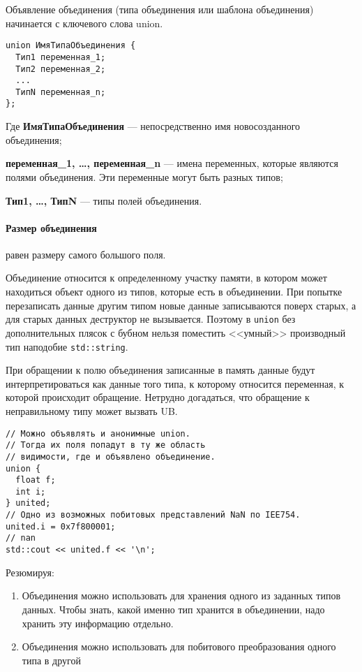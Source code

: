 Объявление объединения (типа объединения или шаблона объединения) начинается с ключевого слова union.

\begin{verbatim}
union ИмяТипаОбъединения {
  Тип1 переменная_1;
  Тип2 переменная_2;
  ...
  ТипN переменная_n;
};
\end{verbatim}

Где
\textbf{ИмяТипаОбъединения} --- непосредственно имя новосозданного объединения;

\textbf{переменная\_1, \dots, переменная\_n} --- имена переменных, которые являются полями объединения.
Эти переменные могут быть разных типов;

\textbf{Тип1, \dots, ТипN} --- типы полей объединения.

\paragraph{Размер объединения} равен размеру самого большого поля.

Объединение относится к определенному участку памяти, в котором может находиться объект одного из типов,
которые есть в объединении. При попытке перезаписать данные другим типом новые данные записываются
поверх старых, а для старых данных деструктор не вызывается. Поэтому в \verb|union| без
дополнительных плясок с бубном нельзя поместить <<умный>> производный тип наподобие \verb|std::string|.

При обращении к полю объединения записанные в память данные будут
интерпретироваться как данные того типа, к которому относится переменная, к которой происходит
обращение. Нетрудно догадаться, что обращение к неправильному типу может вызвать UB.

\begin{verbatim}
// Можно объявлять и анонимные union.
// Тогда их поля попадут в ту же область
// видимости, где и объявлено объединение.
union {
  float f;
  int i;
} united;
// Одно из возможных побитовых представлений NaN по IEE754.
united.i = 0x7f800001;
// nan
std::cout << united.f << '\n';
\end{verbatim}

Резюмируя:
\begin{enumerate}
  \item Объединения можно использовать для хранения одного из заданных типов данных. Чтобы знать,
  какой именно тип хранится в объединении, надо хранить эту информацию отдельно.
  \item Объединения можно использовать для побитового преобразования одного типа в другой
\end{enumerate}

